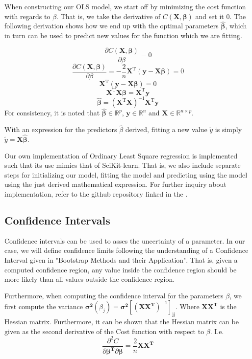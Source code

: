 \documentclass[11pt, a4paper]{article}
\begin{document}
When constructing our OLS model, we start off by minimizing the cost function with regards to $\beta$. That is, we take the derivative of $C(\bm{X},\bm{\beta})$ and set it $0$. The following derivation shows how we end up with the optimal parameters $\bm{\hat{\beta}}$, which in turn can be used to predict new values for the function which we are fitting. 

\[
  \frac{\partial{C(\boldsymbol{X},\boldsymbol{\beta})}}{\partial{\beta}} = 0  
\]
\[
  \frac{\partial{C(\boldsymbol{X},\boldsymbol{\beta})}}{\partial{\beta}} = -\frac{2}{n}\bm{X}^\text{T}\left(\bm{y} - \bm{X}\bm{\beta}\right) = 0
\]
\[
  \bm{X}^\text{T}\left(\bm{y} - \bm{X}\bm{\beta}\right) = 0
\]
\[
  \bm{X}^\text{T}\bm{X}\bm{\beta} = \bm{X}^\text{T}\bm{y}
\]
\[
  \bm{\hat{\beta}} = \left(\bm{X}^\text{T}\bm{X}\right)^{-1}\bm{X}^\text{T}\bm{y}
\]
For consistency, it is noted that $\bm{\hat{\beta}} \in \mathbb{R}^p$, $\bm{y} \in \mathbb{R}^n$ and $\bm{X} \in \mathbb{R}^{n\times{p}}$.

With an expression for the predictors $\hat{\beta}$ derived, fitting a new value $\tilde{y}$ is simply $\tilde{y} = \bm{X}\bm{\hat{\beta}}$.

Our own implementation of Ordinary Least Square regression is implemented such that its use mimics that of SciKit-learn. \cite{scikit-learn} That is, we also include separate steps for initializing our model, fitting the model and predicting using the model using the just derived mathematical expression. For further inquiry about implementation, refer to the github repository linked in the .

\subsection*{Confidence Intervals}
Confidence intervals can be used to asses the uncertainty of a parameter. In our case, we will define confidence limits following the understanding of a Confidence Interval given in "Bootstrap Methods and their Application". That is, given a computed confidence region, any value inside the confidence region should be more likely than all values outside the confidence region. \cite{Davison1997}

Furthermore, when computing the confidence interval for the parameters $\beta$, we first compute the variance $\bm{\sigma^2}(\beta_j) = \bm{\sigma^2}\left[(\bm{X}\bm{X^\text{T}})^{-1}\right]_\text{jj}$. Where $\bm{X}\bm{X^\text{T}}$ is the Hessian matrix. Furthermore, it can be shown that the Hessian matrix can be given as the second derivative of the Cost function with respect to $\beta$. I.e. 
\[
  \frac{\partial^2C}{\partial{\bm{\beta^\text{T}}}\partial{\bm{\beta}}} = \frac{2}{n}\bm{X}\bm{X^\text{T}}
\]
\end{document}
